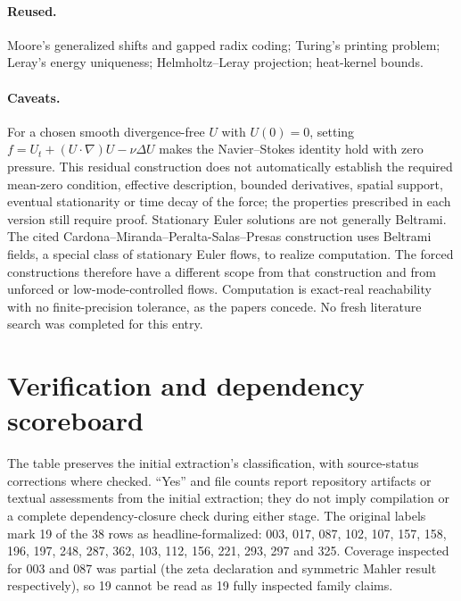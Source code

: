 \documentclass[11pt]{article}
\begin{document}
\paragraph{Reused.}

Moore's generalized shifts and gapped radix coding; Turing's printing problem; Leray's energy uniqueness; Helmholtz--Leray projection; heat-kernel bounds.

\paragraph{Caveats.}

For a chosen smooth divergence-free $U$ with $U(0)=0$, setting $f=U_t+(U\cdot\nabla)U-\nu\Delta U$ makes the Navier--Stokes identity hold with zero pressure. This residual construction does not automatically establish the required mean-zero condition, effective description, bounded derivatives, spatial support, eventual stationarity or time decay of the force; the properties prescribed in each version still require proof. Stationary Euler solutions are not generally Beltrami. The cited Cardona--Miranda--Peralta-Salas--Presas construction uses Beltrami fields, a special class of stationary Euler flows, to realize computation. The forced constructions therefore have a different scope from that construction and from unforced or low-mode-controlled flows. Computation is exact-real reachability with no finite-precision tolerance, as the papers concede. No fresh literature search was completed for this entry.

\section{\texorpdfstring{Verification and dependency scoreboard}{Verification and dependency scoreboard}}\label{sec:scoreboard}
The table preserves the initial extraction's classification, with source-status corrections where checked. ``Yes'' and file counts report repository artifacts or textual assessments from the initial extraction; they do not imply compilation or a complete dependency-closure check during either stage. The original labels mark 19 of the 38 rows as headline-formalized: 003, 017, 087, 102, 107, 157, 158, 196, 197, 248, 287, 362, 103, 112, 156, 221, 293, 297 and 325. Coverage inspected for 003 and 087 was partial (the zeta declaration and symmetric Mahler result respectively), so 19 cannot be read as 19 fully inspected family claims.
\end{document}
